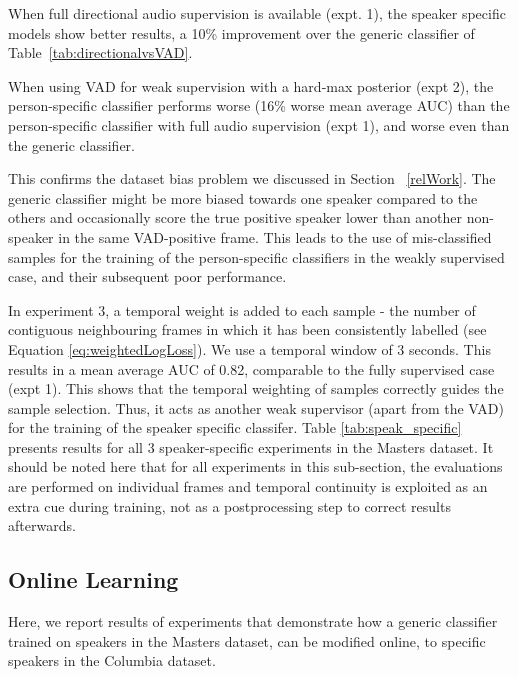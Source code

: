 \documentclass[runningheads]{llncs}
\begin{document}
When full directional audio supervision is available (expt. 1), the speaker specific models show better results, a 10\% improvement over the generic classifier of Table~\ref{tab:directionalvsVAD}. 


When using VAD for weak supervision with a hard-max posterior (expt 2), the person-specific classifier performs worse (16\% worse mean average AUC) than the person-specific classifier with full audio supervision (expt 1), and worse even than the generic classifier. 

This confirms the dataset bias problem we discussed in Section ~\ref{relWork}. The generic classifier might be more biased towards one speaker compared to the others and occasionally score the true positive speaker lower than another non-speaker in the same VAD-positive frame. This leads to the use of mis-classified samples for the training of the person-specific classifiers in the weakly supervised case, and their subsequent poor performance.

In experiment 3, a temporal weight is added to each sample - the number of contiguous neighbouring frames in which it has been consistently labelled  (see Equation \ref{eq:weightedLogLoss}). We use a temporal window of 3 seconds. This results in a mean average AUC of 0.82, comparable to the fully supervised case (expt 1). This shows that the temporal weighting of samples correctly guides the sample selection. Thus, it acts as another weak supervisor (apart from the VAD) for the training of the speaker specific classifer. Table \ref{tab:speak_specific} presents results for all 3 speaker-specific  experiments in the Masters dataset.
It should be noted here that for all experiments in this sub-section, the evaluations are performed on individual frames and temporal continuity is exploited as an extra cue during training, not as a postprocessing step to correct results afterwards. 



\subsection{Online Learning}
Here, we report results of experiments that demonstrate how a generic classifier trained on speakers in the Masters dataset, can be modified online, to specific speakers in the Columbia dataset.
\end{document}
